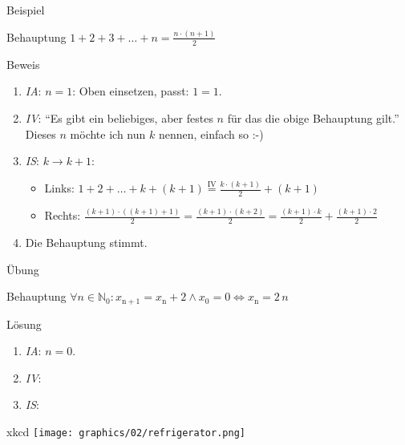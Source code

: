 \begin{frame}{Beispiel}
    \begin{block}{Behauptung}
        $ 1 + 2 + 3 + \dots + n = \frac{ n\cdot \left( n + 1\right) }{2}$\\
    \end{block}
    \pause
    \begin{block}{Beweis}
        \begin{enumerate}
            \item \emph{IA}: $n = 1$: Oben einsetzen, passt: $1 = 1$.
                \pause
            \item \emph{IV}: "`Es gibt ein beliebiges, aber festes $n$ für das die obige Behauptung gilt."' Dieses $n$ möchte ich nun $k$ nennen, einfach so :-)
                \pause
            \item \emph{IS}: $k \rightarrow k + 1$: 
                \begin{itemize}
                    \item Links: $ 1 + 2 + \dots + k + \left( k+1\right) \overset{\text{IV}}{=} \frac{k\cdot \left( k + 1\right)}{2} + \left( k + 1\right)$
                    \item Rechts: $\frac{\left(k + 1\right) \cdot \left(\left( k + 1\right) + 1\right)}{2} = \frac{\left( k + 1\right) \cdot \left( k + 2\right)}{2} = \frac{\left( k + 1\right) \cdot k}{2}  + \frac{\left( k + 1\right)\cdot 2}{2}$
                \end{itemize}
                \pause
            \item Die Behauptung stimmt.
        \end{enumerate}
    \end{block}
\end{frame}

\begin{frame}{Übung}
    \begin{block}{Behauptung}
        $\forall n \in \mathbb{N}_0 : x_{\mathrm{n + 1}} = x_\mathrm{n} + 2 \wedge x_0 = 0 \Leftrightarrow x_\mathrm{n} = 2\, n$
    \end{block}
    \pause
    \begin{block}{Lösung}
        \begin{enumerate}
            \item \emph{IA}: $n = 0$. 
                \pause
            \item \emph{IV}: 
                \pause
            \item \emph{IS}:\\ 
        \end{enumerate}
    \end{block}
\end{frame}

\begin{frame}{xkcd}
\texttt{[image: graphics/02/refrigerator.png]}
\end{frame}


